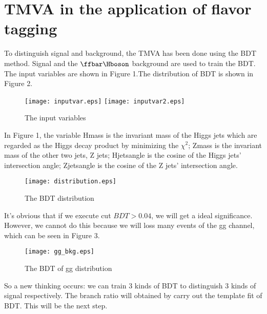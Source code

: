\section{TMVA in the application of flavor tagging}
To distinguish signal and background, the TMVA has been done using the BDT method\cite{BDT}. Signal and the $\ffbar\Hboson$ background are used to train the BDT. The input variables are shown in Figure 1.The distribution of BDT is shown in Figure 2.\par
\begin{figure}[h]
  \centering
  \texttt{[image: inputvar.eps]}
  \texttt{[image: inputvar2.eps]}
  \caption{The input variables}
\end{figure}
In  Figure 1, the variable Hmass is the invariant mass of the Higgs jets which are regarded as the Higgs decay product by minimizing the $\chi^2$; Zmass is the invariant mass of the other two jets, Z jets; Hjetsangle is the cosine of the Higgs jets' intersection angle; Zjetsangle is the cosine of the Z jets' intersection angle.\par
\begin{figure}[h]
  \centering
  \texttt{[image: distribution.eps]}
  \caption{The BDT distribution}
\end{figure}
It's obvious that if we execute cut $BDT>0.04$, we will get a ideal significance. However, we cannot do this because we will loss many events of the gg channel, which can be seen in Figure 3.\par
\begin{figure}[h]
  \centering
  \texttt{[image: gg\_bkg.eps]}
  \caption{The BDT of gg distribution}
\end{figure}
So a new thinking occurs: we can train 3 kinds of BDT to distinguish 3 kinds of signal respectively. The branch ratio will obtained by carry out the template fit of BDT. This will be the next step.
\clearpage
